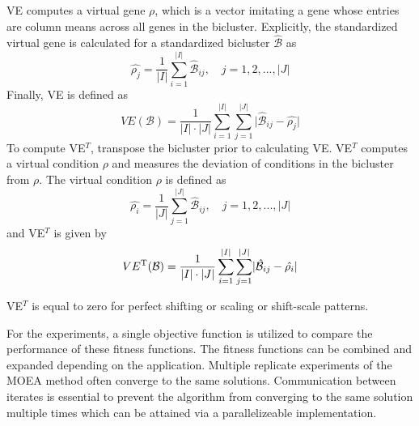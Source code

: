 VE computes a virtual gene $\rho$, which is a vector imitating a gene whose entries are column means across all genes in the bicluster.  Explicitly, the standardized virtual gene is calculated for a standardized bicluster $\hat{\mathcal{B}}$ as
\begin{equation} \label{virtual_gene}
	\hat{\rho_{j}} = \frac{1}{\lvert I \rvert} \sum_{i=1}^{\lvert I \rvert} \hat{\mathcal{B}}_{ij}, \quad j = 1, 2, ..., \lvert J \rvert
\end{equation}
Finally, VE is defined as
\begin{equation}\label{ve}
	VE(\mathcal{B}) = \frac{1}{ \lvert I \rvert \cdot \lvert J \rvert } \sum_{i=1}^{\lvert I \rvert} \sum_{j=1}^{\lvert J \rvert} \lvert \hat{\mathcal{B}}_{ij} - \hat{\rho_j} \rvert
\end{equation}
To compute VE$^T$, transpose the bicluster prior to calculating VE. VE$^T$ computes a virtual condition $\rho$ and measures the deviation of conditions in the bicluster from $\rho$. The virtual condition $\rho$ is defined as
\begin{equation}\label{virtual_condition}
	\hat{\rho_{i}} = \frac{1}{\lvert J \rvert} \sum_{j=1}^{\lvert J \rvert} \hat{\mathcal{B}}_{ij}, \quad j = 1, 2, ..., \lvert J \rvert
\end{equation}
and VE$^T$ is given by
\begin{equation}
	VE\textsuperscript{T}(\mathcal{B}) = \frac{1}{ \lvert I \rvert \cdot \lvert J \rvert } \sum_{i=1}^{\lvert I \rvert} \sum_{j=1}^{\lvert J \rvert} \lvert \hat{\mathcal{B}}_{ij} - \hat{\rho_i} \rvert
\end{equation}


VE$^T$ is equal to zero for perfect shifting or scaling or shift-scale patterns.


For the experiments, a single objective function is utilized to compare the performance of these fitness functions. The fitness functions can be combined and expanded depending on the application. Multiple replicate experiments of the MOEA method often converge to the same solutions. Communication between iterates is essential to prevent the algorithm from converging to the same solution multiple times which can be attained via a parallelizeable implementation.

